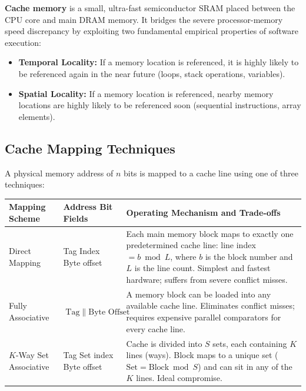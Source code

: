 \documentclass[12pt,a4paper]{article}
\begin{document}
\begin{tcolorbox}[defbox, title={Cache Memory and Locality Principles}]
\textbf{Cache memory} is a small, ultra-fast semiconductor SRAM placed between the CPU core and main DRAM memory. It bridges the severe processor-memory speed discrepancy by exploiting two fundamental empirical properties of software execution:
\begin{itemize}[leftmargin=*]
  \item \textbf{Temporal Locality:} If a memory location is referenced, it is highly likely to be referenced again in the near future (loops, stack operations, variables).
  \item \textbf{Spatial Locality:} If a memory location is referenced, nearby memory locations are highly likely to be referenced soon (sequential instructions, array elements).
\end{itemize}
\end{tcolorbox}

\subsection{Cache Mapping Techniques}
A physical memory address of $n$ bits is mapped to a cache line using one of three techniques:
\par\vspace{6pt}\noindent
\begingroup
\setlength{\extrarowheight}{2.5pt}
\noindent\begin{tabularx}{\linewidth}{|B{3.2cm}|B{3.4cm}|Y|}
\hline
\textbf{Mapping Scheme} & \textbf{Address Bit Fields} & \textbf{Operating Mechanism and Trade-offs} \\ \hline
Direct Mapping & Tag \textbar{} Index\newline \textbar{} Byte offset & Each main memory block maps to exactly one predetermined cache line: line index $= b \bmod L$, where $b$ is the block number and $L$ is the line count. Simplest and fastest hardware; suffers from severe conflict misses. \\ \hline
Fully Associative & $\text{Tag} \;\|\; \text{Byte Offset}$ & A memory block can be loaded into any available cache line. Eliminates conflict misses; requires expensive parallel comparators for every cache line. \\ \hline
$K$-Way Set Associative & Tag \textbar{} Set index\newline \textbar{} Byte offset & Cache is divided into $S$ sets, each containing $K$ lines (ways). Block maps to a unique set ($\text{Set} = \text{Block} \bmod S$) and can sit in any of the $K$ lines. Ideal compromise. \\ \hline
\end{tabularx}\par
\endgroup
\end{document}
